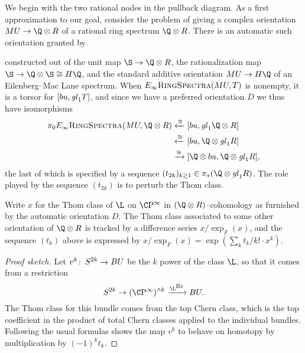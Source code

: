 We begin with the two rational nodes in the pullback diagram.  As a first approximation to our goal, consider the problem of giving a complex orientation \(MU \to \Q \otimes R\) of a rational ring spectrum \(\Q \otimes R\).  There is an automatic such orientation granted by
\begin{center}
\end{center}
constructed out of the unit map \(\S \to \Q \otimes R\), the rationalization map \(\S \to \Q \otimes \S \cong H\Q\), and the standard additive orientation \(MU \to H\Q\) of an Eilenberg--Mac Lane spectrum.  When \(E_\infty\normalfont\textsc{RingSpectra}(MU, T)\) is nonempty, it is a torsor for \([bu, \mathit{gl}_1 T]\), and since we have a preferred orientation \(D\) we thus have isomorphisms
\begin{align*}
\pi_0 \EinftyRings(MU, \Q \otimes R) & \xleftarrow{\cong} [bu, \gl_1 \Q \otimes R] \\
& \xleftarrow{\cong} [bu, \Q \otimes \gl_1 R] \\
&\xrightarrow{\cong} [\Q \otimes bu, \Q \otimes \gl_1 R],
\end{align*}
the last of which is specified by a sequence \((t_{2k})_{k \ge 1} \in \pi_* (\Q \otimes \gl_1 R)\).  The role played by the sequence \((t_{2k})\) is to perturb the Thom class.

\begin{lemma}
Write \(x\) for the Thom class of \(\L\) on \(\CP^\infty\) in \((\Q \otimes R)\)--cohomology as furnished by the automatic orientation \(D\).  The Thom class associated to some other orientation of \(\Q \otimes R\) is tracked by a difference series \(x / \exp_F(x)\), and the sequence \((t_k)\) above is expressed by \(x / \exp_F(x) = \exp(\sum_k t_k/k! \cdot x^k)\).
\end{lemma}
\begin{proof}[Proof sketch]
Let \(v^k\colon\thinspace S^{2k} \to BU\) be the \(k\){\th} power of the class \(\L\), so that it comes from a restriction \[S^{2k} \to (\CP^\infty)^{\sm k} \xrightarrow{\L^{\boxtimes k}} BU.\]  The Thom class for this bundle comes from the top Chern class, which is the top coefficient in the product of total Chern classes applied to the individual bundles.  Following the usual formulas shows the map \(v^k\) to behave on homotopy by multiplication by \((-1)^k t_k\).
\end{proof}

